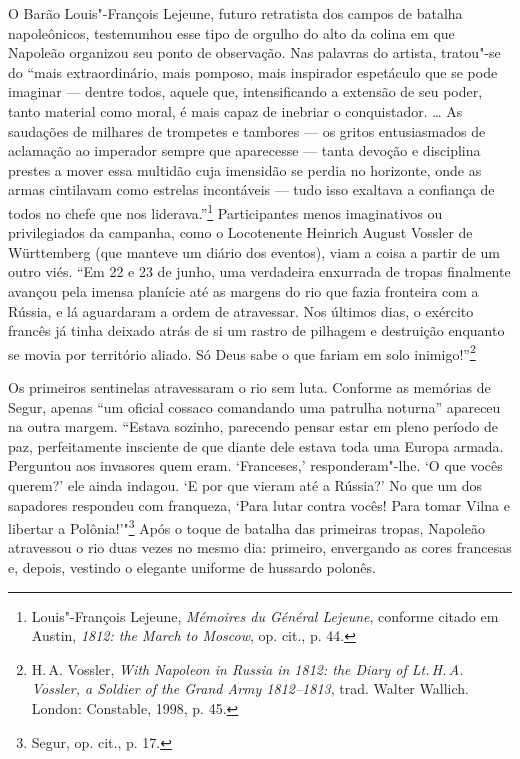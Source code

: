 %

O Barão Louis"-François Lejeune, futuro retratista dos campos de batalha
napoleônicos, testemunhou esse tipo de orgulho do alto da colina em que
Napoleão organizou seu ponto de observação. Nas palavras do artista,
tratou"-se do ``mais extraordinário, mais pomposo, mais inspirador
espetáculo que se pode imaginar --- dentre todos, aquele que,
intensificando a extensão de seu poder, tanto material como moral, é
mais capaz de inebriar o conquistador. \ldots{} As saudações de milhares
de trompetes e tambores --- os gritos entusiasmados de aclamação ao
imperador sempre que aparecesse --- tanta devoção e disciplina prestes a
mover essa multidão cuja imensidão se perdia no horizonte, onde as armas
cintilavam como estrelas incontáveis --- tudo isso exaltava a confiança de
todos no chefe que nos liderava.''\footnote{Louis"-François Lejeune,
  \emph{Mémoires du Général Lejeune}, conforme citado em Austin,
  \emph{1812: the March to Moscow}, op. cit., p. 44.} Participantes
menos imaginativos ou privilegiados da campanha, como o Locotenente
Heinrich August Vossler de Württemberg (que manteve um diário dos
eventos), viam a coisa a partir de um outro viés. ``Em 22 e 23 de junho,
uma verdadeira enxurrada de tropas finalmente avançou pela imensa
planície até as margens do rio que fazia fronteira com a Rússia, e lá
aguardaram a ordem de atravessar. Nos últimos dias, o exército francês
já tinha deixado atrás de si um rastro de pilhagem e destruição enquanto
se movia por território aliado. Só Deus sabe o que fariam em solo
inimigo!''\footnote{H.\,A. Vossler, \emph{With Napoleon in Russia in
  1812: the Diary of Lt.\,H.\,A. Vossler, a Soldier of the Grand Army
  1812--1813}, trad. Walter Wallich. London: Constable, 1998, p. 45.}

Os primeiros sentinelas atravessaram o rio sem luta. Conforme as
memórias de Segur, apenas ``um oficial cossaco comandando uma patrulha
noturna'' apareceu na outra margem. ``Estava sozinho, parecendo pensar
estar em pleno período de paz, perfeitamente insciente de que diante
dele estava toda uma Europa armada. Perguntou aos invasores quem eram.
`Franceses,' responderam"-lhe. `O que vocês querem?' ele ainda indagou.
`E por que vieram até a Rússia?' No que um dos sapadores respondeu com
franqueza, `Para lutar contra vocês! Para tomar Vilna e libertar a
Polônia!'"\footnote{Segur, op. cit., p. 17.} Após o toque de batalha
das primeiras tropas, Napoleão atravessou o rio duas vezes no mesmo dia:
primeiro, envergando as cores francesas e, depois, vestindo o elegante
uniforme de hussardo polonês.

